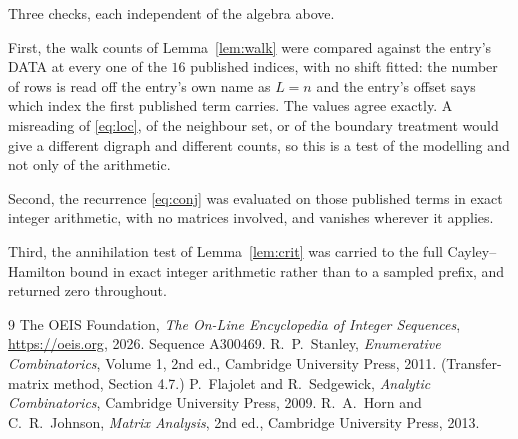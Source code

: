 \documentclass[11pt,a4paper]{article}
\theoremstyle{plain}
\theoremstyle{definition}
\begin{document}
Three checks, each independent of the algebra above.

First, the walk counts of Lemma~\ref{lem:walk} were compared against the entry's DATA at
every one of the $16$ published indices, with no shift fitted: the number of rows is
read off the entry's own name as $L=n$ and the entry's offset says which index the first
published term carries. The values agree exactly. A misreading of \eqref{eq:loc}, of the
neighbour set, or of the boundary treatment would give a different digraph and different
counts, so this is a test of the modelling and not only of the arithmetic.

Second, the recurrence \eqref{eq:conj} was evaluated on those published terms in exact
integer arithmetic, with no matrices involved, and vanishes wherever it applies.

Third, the annihilation test of Lemma~\ref{lem:crit} was carried to the full
Cayley--Hamilton bound in exact integer arithmetic rather than to a sampled prefix, and
returned zero throughout.

\begin{thebibliography}{9}
 The OEIS Foundation, \emph{The On-Line Encyclopedia of Integer
Sequences}, \url{https://oeis.org}, 2026. Sequence A300469.
 R.~P.~Stanley, \emph{Enumerative Combinatorics}, Volume 1, 2nd ed.,
Cambridge University Press, 2011. (Transfer-matrix method, Section 4.7.)
 P.~Flajolet and R.~Sedgewick, \emph{Analytic Combinatorics}, Cambridge
University Press, 2009.
 R.~A.~Horn and C.~R.~Johnson, \emph{Matrix Analysis}, 2nd ed., Cambridge
University Press, 2013.
\end{thebibliography}
\end{document}
